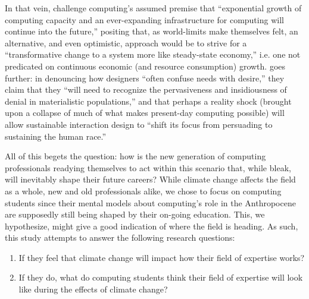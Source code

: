 In that vein, \citet{nardiComputingLimits2018} challenge computing's assumed premise that ``exponential growth of computing capacity and an ever-expanding infrastructure for computing will continue into the future,'' positing that, as world-limits make themselves felt, an alternative, and even optimistic, approach would be to strive for a ``transformative change to a system more like steady-state economy,'' i.e. one not predicated on continuous economic (and resource consumption) growth. 
\citet{wong2009prepare} goes further: in denouncing how designers ``often confuse needs with desire,'' they claim that they ``will need to recognize the pervasiveness and insidiousness of denial in materialistic populations,'' and that perhaps a reality shock (brought upon a collapse of much of what makes present-day computing possible) will allow sustainable interaction design to ``shift its focus from persuading to sustaining the human race.''

All of this begets the question: how is the new generation of computing professionals readying themselves to act within this scenario that, while bleak, will inevitably shape their future careers? While climate change affects the field as a whole, new and old professionals alike, we chose to focus on computing students since their mental models about computing's role in the Anthropocene are supposedly still being shaped by their on-going education. This, we hypothesize, might give a good indication of where the field is heading. As such, this study attempts to answer the following research questions:

\begin{enumerate}
    \item If they feel that climate change will impact how their field of expertise works?
    \item If they do, what do computing students think their field of expertise will look like during the effects of climate change?
\end{enumerate}